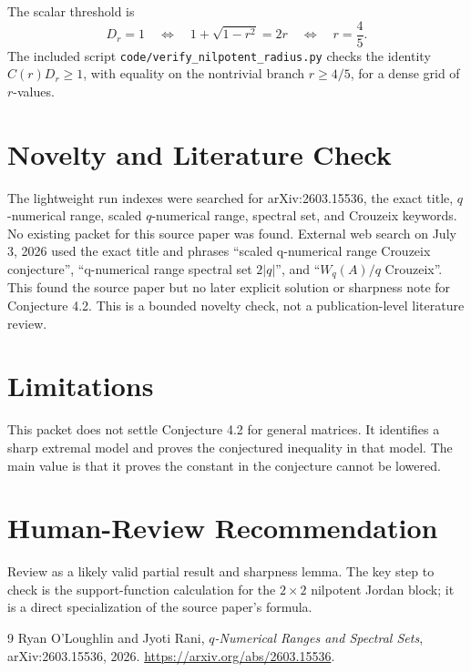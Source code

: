\documentclass[11pt]{article}
\begin{document}
The scalar threshold is
\[
D_r=1
\quad\Longleftrightarrow\quad
1+\sqrt{1-r^2}=2r
\quad\Longleftrightarrow\quad
r=\frac45 .
\]
The included script \texttt{code/verify\_nilpotent\_radius.py} checks the
identity \(C(r)D_r\ge1\), with equality on the nontrivial branch \(r\ge4/5\),
for a dense grid of \(r\)-values.

\section*{Novelty and Literature Check}

The lightweight run indexes were searched for arXiv:2603.15536, the exact
title, \(q\)-numerical range, scaled \(q\)-numerical range, spectral set, and
Crouzeix keywords.  No existing packet for this source paper was found.
External web search on July 3, 2026 used the exact title and phrases
``scaled q-numerical range Crouzeix conjecture'', ``q-numerical range spectral
set \(2|q|\)'', and ``\(W_q(A)/q\) Crouzeix''.  This found the source paper but
no later explicit solution or sharpness note for Conjecture 4.2.  This is a
bounded novelty check, not a publication-level literature review.

\section*{Limitations}

This packet does not settle Conjecture 4.2 for general matrices.  It identifies
a sharp extremal model and proves the conjectured inequality in that model.
The main value is that it proves the constant in the conjecture cannot be
lowered.

\section*{Human-Review Recommendation}

Review as a likely valid partial result and sharpness lemma.  The key step to
check is the support-function calculation for the \(2\times2\) nilpotent
Jordan block; it is a direct specialization of the source paper's formula.

\begin{thebibliography}{9}
Ryan O'Loughlin and Jyoti Rani,
\emph{\(q\)-Numerical Ranges and Spectral Sets},
arXiv:2603.15536, 2026.
\url{https://arxiv.org/abs/2603.15536}.
\end{thebibliography}
\end{document}
